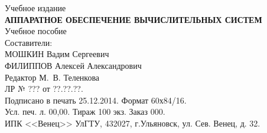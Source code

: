 \thispagestyle{empty}
\null
\vfill
\begin{center}
\small
Учебное издание\\
\vspace{0.4cm}
\textbf{АППАРАТНОЕ ОБЕСПЕЧЕНИЕ ВЫЧИСЛИТЕЛЬНЫХ СИСТЕМ}\\
\vspace{0.4cm}
Учебное пособие\\
\vspace{0.4cm}
Составители:\\
МОШКИН Вадим Сергеевич\\
ФИЛИППОВ Алексей Александрович\\
\vspace{0.4cm}
Редактор М.~В. Теленкова\\
\vspace{0.4cm}
ЛР № ??? от ??.??.??.\\
Подписано в печать 25.12.2014. Формат 60х84/16.\\
Усл. печ. л. 00,00. Тираж 100 экз. Заказ 000.\\
\vspace{0.4cm}
ИПК <<Венец>> УлГТУ, 432027, г.Ульяновск, ул. Сев. Венец, д. 32.
\end{center}